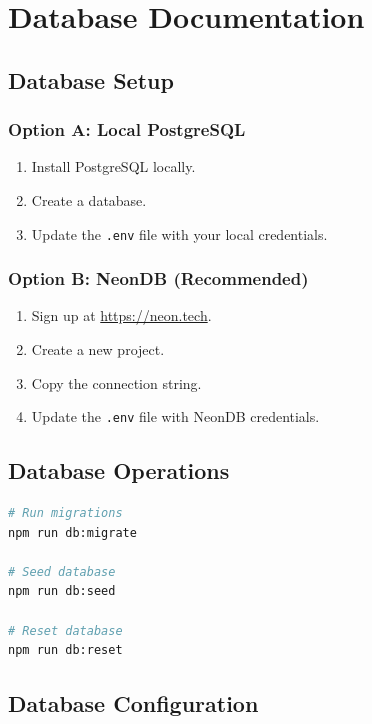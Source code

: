 \chapter{Database Documentation}

\section{Database Setup}

\subsection{Option A: Local PostgreSQL}
\begin{enumerate}
    \item Install PostgreSQL locally.
    \item Create a database.
    \item Update the \texttt{.env} file with your local credentials.
\end{enumerate}

\subsection{Option B: NeonDB (Recommended)}
\begin{enumerate}
    \item Sign up at \url{https://neon.tech}.
    \item Create a new project.
    \item Copy the connection string.
    \item Update the \texttt{.env} file with NeonDB credentials.
\end{enumerate}

\section{Database Operations}

\begin{lstlisting}[language=bash, caption=Database Commands]
# Run migrations
npm run db:migrate

# Seed database
npm run db:seed

# Reset database
npm run db:reset
\end{lstlisting}

\section{Database Configuration}

